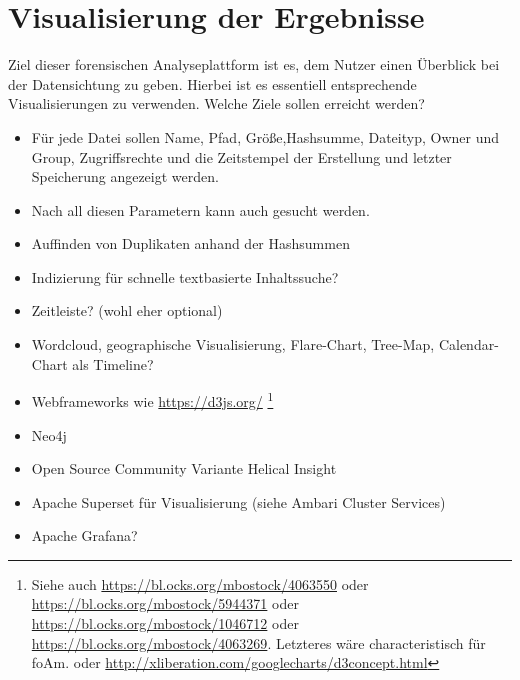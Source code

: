 \section{Visualisierung der Ergebnisse}
Ziel dieser forensischen Analyseplattform ist es, dem Nutzer einen Überblick bei der Datensichtung zu geben. Hierbei ist es essentiell entsprechende Visualisierungen zu verwenden.
Welche Ziele sollen erreicht werden?
\begin{itemize}
\item Für jede Datei sollen Name, Pfad, Größe,Hashsumme, Dateityp, Owner und Group, Zugriffsrechte und die Zeitstempel der Erstellung und letzter Speicherung angezeigt werden. 
\item Nach all diesen Parametern kann auch gesucht werden.
\item Auffinden von Duplikaten anhand der Hashsummen
\item Indizierung für schnelle textbasierte Inhaltssuche?
\item Zeitleiste? (wohl eher optional)
\item Wordcloud, geographische Visualisierung, Flare-Chart, Tree-Map, Calendar-Chart als Timeline?
\item Webframeworks wie \url{https://d3js.org/} \footnote{Siehe auch \url{https://bl.ocks.org/mbostock/4063550} oder \url{https://bl.ocks.org/mbostock/5944371} oder \url{https://bl.ocks.org/mbostock/1046712} oder \url{https://bl.ocks.org/mbostock/4063269}. Letzteres wäre characteristisch für foAm. oder \url{http://xliberation.com/googlecharts/d3concept.html}}
\item Neo4j
\item Open Source Community Variante Helical Insight
\item Apache Superset für Visualisierung (siehe Ambari Cluster Services)
\item Apache Grafana?
\end{itemize}
